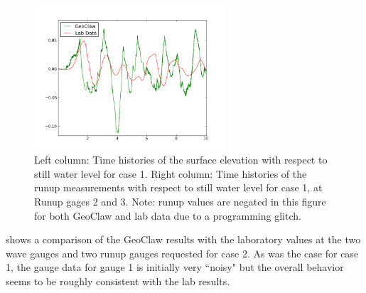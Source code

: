 \begin{figure}[ht]
\hfil\includegraphics[width=2.8in]{bp12/case1runupgauge3.png}\hfil
\caption{\label{fig:bp8gauges1}
Left column: Time histories of the surface elevation with respect to still
water level for case 1.
Right column: Time histories of the runup measurements with respect
to still water level for case 1, at Runup gages 2 and 3.  Note: runup
values are negated in this figure for both GeoClaw and lab data due to
a programming glitch.
  }
\end{figure}



 shows a comparison of the GeoClaw results with the
laboratory values at the two wave gauges and two runup gauges requested
for case 2.  As was the case for case 1, the gauge data for gauge 1 is initially
very ``noisy" but the overall behavior seems to be roughly consistent
with the lab results. 

